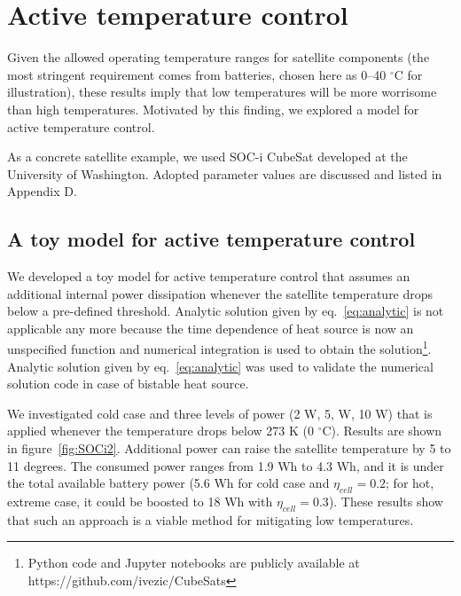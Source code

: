\documentclass[]{aastex62}
\begin{document}
\section{Active temperature control \label{sec:active}} 

Given the allowed operating temperature ranges for satellite components (the most stringent requirement
comes from batteries, chosen here as 0--40 $^\circ$C for illustration), these results imply that 
low temperatures will be more worrisome than high temperatures. Motivated by this finding, we 
explored a model for active temperature control.

As a concrete satellite example, we used SOC-i CubeSat developed at the University of Washington. 
Adopted parameter values are discussed and listed in Appendix D. 


\subsection{A toy model for active temperature control } 

We developed a toy model for active temperature control that assumes an additional internal power 
dissipation whenever the satellite temperature drops below a pre-defined threshold. Analytic solution
given by eq.~\ref{eq:analytic} is not applicable any more because the time dependence of heat source
is now an unspecified function and numerical integration is used to obtain the solution\footnote{Python
code and Jupyter notebooks are publicly available at https://github.com/ivezic/CubeSats}. Analytic 
solution given by eq.~\ref{eq:analytic} was used to validate the numerical solution code in case of bistable 
heat source. 

We investigated cold case and three levels of power (2 W, 5, W, 10 W) that is applied whenever the temperature 
drops below 273 K (0 $^\circ$C). Results are shown in figure~\ref{fig:SOCi2}. 
Additional power can raise the satellite temperature by 5 to 11 degrees. The consumed power ranges
from 1.9 Wh to 4.3 Wh, and it is under the total available battery power (5.6 Wh for cold case and
$\eta_{cell}=0.2$; for hot, extreme case, it could be boosted to 18 Wh with $\eta_{cell}=0.3$). 
These results show that such an approach is a viable method for mitigating low temperatures.
\end{document}
